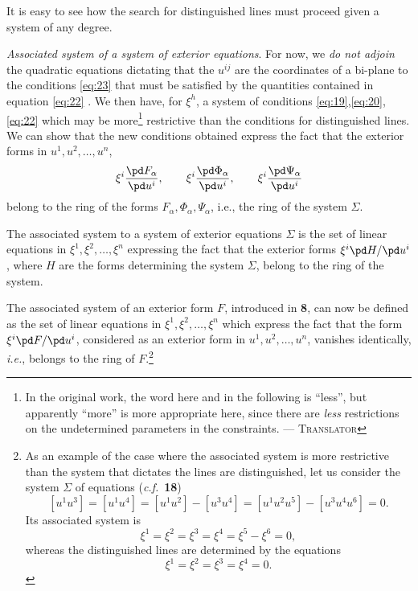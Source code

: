 It is easy to see how the search for distinguished lines must proceed given a system of any degree.

\vspace{12pt}\fsec \emph{Associated system of a system of exterior equations}. For now, we \emph{do not adjoin} the quadratic equations dictating that the $u^{ij}$ are the coordinates of a bi-plane to the conditions \eqref{eq:23} that must be  satisfied by the quantities contained in equation \eqref{eq:22} . We then have, for $\xi^{h}$, a system of conditions \eqref{eq:19},\eqref{eq:20}, \eqref{eq:22} which may be more\footnote{In the original work, the word here and in the following is ``less'', but apparently ``more'' is more appropriate here, since there are \emph{less} restrictions on the undetermined parameters in the constraints. --- \textsc{Translator}} restrictive than the conditions for distinguished lines. We can show that the new conditions obtained express the fact that the exterior forms in $u^{1},u^{2},\dots,u^{n}$,
\[
\xi^{i}\frac{\pd F_{\alpha}}{\pd u^{i}},\qquad
\xi^{i}\frac{\pd \Phi_{\alpha}}{\pd u^{i}},\qquad
\xi^{i}\frac{\pd \Psi_{\alpha}}{\pd u^{i}}
\]
belong to the ring of the forms $F_{\alpha},\Phi_{\alpha},\Psi_{\alpha}$, {i.e.}, the ring of the system $\Sigma$.

\begin{dfn*}
  The associated system to a system of exterior equations $\Sigma$ is the set of linear equations in $\xi^{1},\xi^{2},\dots,\xi^{n}$  expressing the fact that the exterior forms $\xi^{i}\pd H/\pd u^{i}$, where $H$ are the forms determining the system $\Sigma$, belong to the ring of the system.
\end{dfn*}

The associated system of an exterior form $F$, introduced in \textsection\textbf{8}, can now be defined as the set of linear equations in $\xi^{1},\xi^{2},\dots,\xi^{n}$ which express the fact that the form $\xi^{i}\pd F/\pd u^{i}$, considered as an exterior form in $u^{1},u^{2},\dots,u^{n}$, vanishes identically, \emph{i.e.}, belongs to the ring of $F$.\footnote{As an example of the case where the associated system is more restrictive than the system that dictates the lines are distinguished, let us consider the system $\Sigma$ of equations (\emph{c.f.}~\textsection\textbf{18})
\[
[u^{1}u^{3}]=
[u^{1}u^{4}]=
[u^{1}u^{2}]-[u^{3}u^{4}]=
[u^{1}u^{2}u^{5}]-[u^{3}u^{4}u^{6}]=
0.
\]
Its associated system is
\[
\xi^{1}=
\xi^{2}=
\xi^{3}=
\xi^{4}=
\xi^{5}-
\xi^{6}=
0,
\]
whereas the distinguished lines are determined by the equations
\[
\xi^{1}=
\xi^{2}=
\xi^{3}=
\xi^{4}=
0.
\]
}

